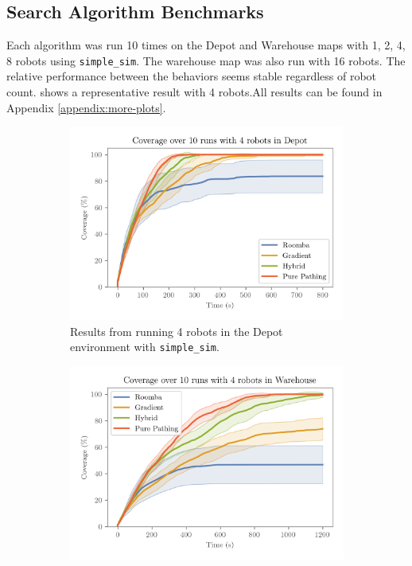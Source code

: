 \subsection{Search Algorithm Benchmarks}
\label{sec:search-algorithms-benchmark}
Each algorithm was run 10 times on the Depot and Warehouse maps with 1, 2, 4, 8 robots using \texttt{simple\_sim}. The warehouse map was also run with 16 robots. The relative performance between the behaviors seems stable regardless of robot count.  shows a representative result with 4 robots.All results can be found in Appendix \ref{appendix:more-plots}. 


\begin{figure}[H]
  \centering
  \begin{subfigure}[b]{0.49\textwidth}
    \centering
    \includegraphics[width=\textwidth]{./figures/plots/benchmarks/coverage-over-10-runs-with-4-robots-in-depot.png}
      \caption{Results from running 4 robots in the Depot environment with \texttt{simple\_sim}.}
  \end{subfigure}
  \begin{subfigure}[b]{0.49\textwidth}
    \centering
    \includegraphics[width=\textwidth]{./figures/plots/benchmarks/coverage-over-10-runs-with-4-robots-in-warehouse.png}

\end{subfigure}
\end{figure}
